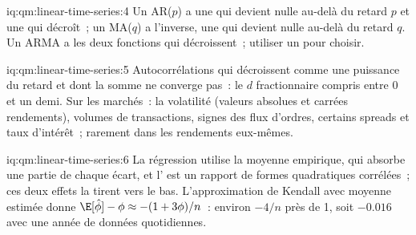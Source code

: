 \begin{solution}{iq:qm:linear-time-series:4}
Un AR($p$) a une  qui devient nulle au-delà du retard $p$ et une  qui décroît~; un MA($q$) a l'inverse, une
 qui devient nulle au-delà du retard $q$. Un ARMA a les deux fonctions qui décroissent~; utiliser un  pour choisir.
\end{solution}

\begin{solution}{iq:qm:linear-time-series:5}
Autocorrélations qui décroissent comme une puissance du retard et dont la somme ne converge pas~: le $d$ fractionnaire compris entre 0 et un demi. Sur les marchés~: la volatilité (valeurs absolues et carrées
rendements), volumes de transactions, signes des flux d'ordres, certains spreads et taux d'intérêt~; rarement dans les rendements eux-mêmes.
\end{solution}

\begin{solution}{iq:qm:linear-time-series:6}
La régression utilise la moyenne empirique, qui absorbe une partie de chaque écart, et l' est un rapport de formes quadratiques corrélées~; ces deux effets la tirent vers le bas. L'approximation de Kendall
avec moyenne estimée donne $\E[\hat\phi] - \phi \approx -(1 + 3\phi)/n$~: environ $-4/n$ près de 1, soit $-0.016$ avec une année de données quotidiennes.
\end{solution}
